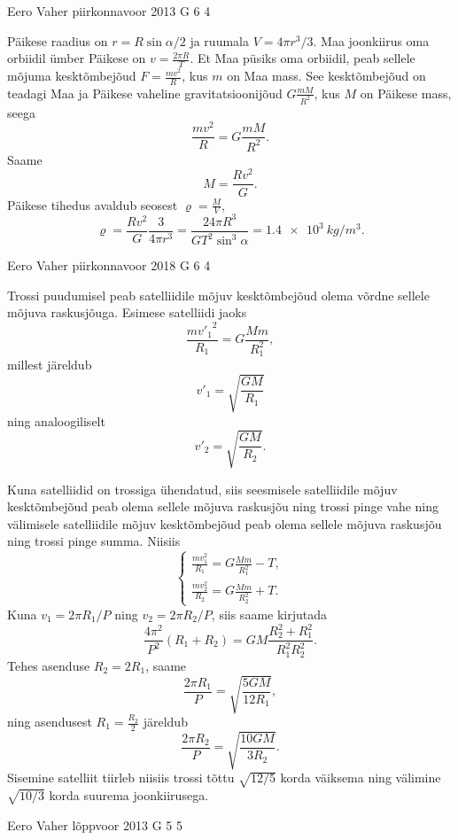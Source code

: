 \documentclass[11pt, twoside]{article}
\begin{document}
{%
{Eero Vaher} %
{piirkonnavoor} %
{2013} %
{G 6} %
{4} %
{

\ifSolution
Päikese raadius on $r=R\sin\alpha/2$ ja ruumala $V=4\pi r^3/3$.
Maa joonkiirus oma orbiidil ümber Päikese on $v=\frac{2\pi R}{T}$. Et Maa püsiks oma orbiidil, peab sellele mõjuma kesktõmbejõud $F=\frac{mv^2}{R}$, kus $m$ on Maa mass. See kesktõmbejõud on teadagi Maa ja Päikese vaheline gravitatsioonijõud $G\frac{mM}{R^2}$, kus $M$ on Päikese mass, seega
\[
\frac{mv^2}{R}=G\frac{mM}{R^2}.
\]
Saame
\[
M=\frac{Rv^2}{G}.
\]
Päikese tihedus avaldub seosest $\varrho=\frac{M}{V}$, $$\varrho=\frac{Rv^2}{G} \frac{3}{4\pi r^3}=\frac{24 \pi R^3}{G T^2 \sin^3 \alpha}=\SI{1,4e3}{kg/m^3}.$$
\fi
}

{Eero Vaher} %
{piirkonnavoor} %
{2018} %
{G 6} %
{4} %
{

\ifSolution
Trossi puudumisel peab satelliidile mõjuv kesktõmbejõud olema võrdne sellele mõjuva raskusjõuga. Esimese satelliidi jaoks
\[
\frac{{mv'_1}^2}{R_1}=G\frac{Mm}{R_1^2},
\]
millest järeldub
\[
v'_1=\sqrt{\frac{GM}{R_1}}
\]
ning analoogiliselt
\[
v'_2=\sqrt{\frac{GM}{R_2}}.
\]

Kuna satelliidid on trossiga ühendatud, siis seesmisele satelliidile mõjuv kesktõmbejõud peab olema sellele mõjuva raskusjõu ning trossi pinge vahe ning välimisele satelliidile mõjuv kesktõmbejõud peab olema sellele mõjuva raskusjõu ning trossi pinge summa. Niisiis
$$\begin{cases}
\frac{mv_1^2}{R_1}=G\frac{Mm}{R_1^2}-T,\\
\frac{mv_2^2}{R_2}=G\frac{Mm}{R_2^2}+T.
\end{cases}$$ 
Kuna $v_1=2\pi R_1/P$ ning $v_2=2\pi R_2/P$, siis saame kirjutada
$$\frac{4\pi^2}{P^2}\left(R_1+R_2\right)=GM\frac{R_2^2+R_1^2}{R_1^2R_2^2}.$$
Tehes asenduse $R_2=2R_1$, saame
\[
\frac{2\pi R_1}{P}=\sqrt{\frac{5GM}{12R_1}},
\]
ning asendusest $R_1=\frac{R_2}{2}$ järeldub
\[
\frac{2\pi R_2}{P}=\sqrt{\frac{10GM}{3R_2}}.
\]
Sisemine satelliit tiirleb niisiis trossi tõttu $\sqrt{12/5}$ korda väiksema ning välimine $\sqrt{10/3}$ korda suurema joonkiirusega.
\fi
}

{Eero Vaher} %
{lõppvoor} %
{2013} %
{G 5} %
{5} %
{

}}
\end{document}
